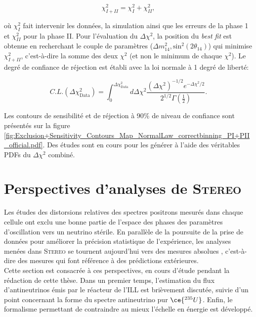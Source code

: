 \begin{equation}
    \chi^2_{I + II} = \chi^2_{I} + \chi^2_{II},
\end{equation}

\bigbreak

où $\chi^2_{I}$ fait intervenir les données, la simulation ainsi que les erreurs de la phase 1 et $\chi^2_{II}$ pour la phase II. Pour l'évaluation du $\Delta\chi^2$, la position du \textit{best fit} est obtenue en recherchant le couple de paramètres ($\Delta m_{14}^2, \textrm{sin}^2\left(2\theta_{14}\right)$) qui minimise $\chi^2_{I + II}$, c'est-à-dire la somme des deux $\chi^2$ (et non le minimum de chaque $\chi^2$). Le degré de confiance de réjection est établi avec la loi normale à 1 degré de liberté:

\begin{equation}
    C.L.\left(\Delta\chi^2_\textrm{Data}\right) = \int_0^{\Delta\chi^2_\textrm{Data}} d\Delta\chi^2 \frac{\left( \Delta\chi^2 \right)^{-1/2} e^{-\Delta\chi^2/2}}{2^{1/2} \Gamma\left(\frac{1}{2}\right)}.
\end{equation}

\bigbreak

Les contours de sensibilité et de réjection à 90\% de niveau de confiance sont présentés sur la figure \ref{fig:Exclusion+Sensitivity_Contours_Map_NormalLaw_correctbinning_PI+PII_official.pdf}. Des études sont en cours pour les générer à l'aide des véritables PDFs du $\Delta\chi^2$ combiné.

\bigbreak

\section{Perspectives d'analyses de \textsc{Stereo}}

Les études des distorsions relatives des spectres positrons mesurés dans chaque cellule ont exclu une bonne partie de l'espace des phases des paramètres d'oscillation vers un neutrino stérile. En parallèle de la poursuite de la prise de données pour améliorer la précision statistique de l'expérience, les analyses menées dans \textsc{Stereo} se tournent aujourd'hui vers des mesures \og absolues \fg{}, c'est-à-dire des mesures qui font référence à des prédictions extérieures.\\

Cette section est consacrée à ces perspectives, en cours d'étude pendant la rédaction de cette thèse. Dans un premier temps, l'estimation du flux d'antineutrinos émis par le réacteur de l'ILL est brièvement discutée, suivie d'un point concernant la forme du spectre antineutrino pur $\ce{^{235}U}$. Enfin, le formalisme permettant de contraindre au mieux l'échelle en énergie est développé.

